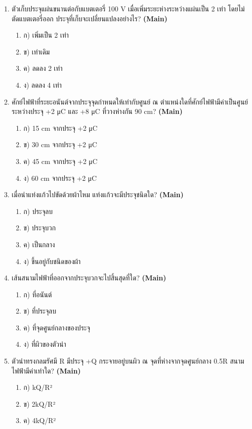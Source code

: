 \documentclass[12pt]{article}
\begin{document}
\begin{enumerate}[label=\arabic*.]
\item ตัวเก็บประจุแผ่นขนานต่อกับแบตเตอรี่ 100 V เมื่อเพิ่มระยะห่างระหว่างแผ่นเป็น 2 เท่า โดยไม่ตัดแบตเตอรี่ออก ประจุที่เก็บจะเปลี่ยนแปลงอย่างไร? \hfill \textbf{\small (Main)}
\begin{enumerate}[label=)]
\item ก) เพิ่มเป็น 2 เท่า
\item ข) เท่าเดิม
\item ค) ลดลง 2 เท่า
\item ง) ลดลง 4 เท่า
\end{enumerate}
\item ศักย์ไฟฟ้าที่ระยะอนันต์จากประจุจุดกำหนดให้เท่ากับศูนย์ ณ ตำแหน่งใดที่ศักย์ไฟฟ้ามีค่าเป็นศูนย์ ระหว่างประจุ +2 μC และ +8 μC ที่วางห่างกัน 90 cm? \hfill \textbf{\small (Main)}
\begin{enumerate}[label=)]
\item ก) 15 cm จากประจุ +2 μC
\item ข) 30 cm จากประจุ +2 μC
\item ค) 45 cm จากประจุ +2 μC
\item ง) 60 cm จากประจุ +2 μC
\end{enumerate}
\item เมื่อนำแท่งแก้วไปขัดด้วยผ้าไหม แท่งแก้วจะมีประจุชนิดใด? \hfill \textbf{\small (Main)}
\begin{enumerate}[label=)]
\item ก) ประจุลบ
\item ข) ประจุบวก
\item ค) เป็นกลาง
\item ง) ขึ้นอยู่กับชนิดของผ้า
\end{enumerate}
\item เส้นสนามไฟฟ้าที่ออกจากประจุบวกจะไปสิ้นสุดที่ใด? \hfill \textbf{\small (Main)}
\begin{enumerate}[label=)]
\item ก) ที่อนันต์
\item ข) ที่ประจุลบ
\item ค) ที่จุดศูนย์กลางของประจุ
\item ง) ที่ผิวของตัวนำ
\end{enumerate}
\item ตัวนำทรงกลมรัศมี R มีประจุ +Q กระจายอยู่บนผิว ณ จุดที่ห่างจากจุดศูนย์กลาง 0.5R สนามไฟฟ้ามีค่าเท่าใด? \hfill \textbf{\small (Main)}
\begin{enumerate}[label=)]
\item ก) kQ/R²
\item ข) 2kQ/R²
\item ค) 4kQ/R²

\end{enumerate}
\end{enumerate}
\end{document}
